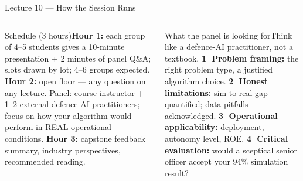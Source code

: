 \documentclass[aspectratio=169,10pt,t]{beamer}
\begin{document}

\begin{frame}{Lecture 10 --- How the Session Runs}
\begin{columns}[T]
\begin{cbox}{Schedule (3 hours)}\scriptsize\textbf{Hour 1:} each group of 4--5 students gives a 10-minute presentation + 2 minutes of panel Q\&A; slots drawn by lot; 4--6 groups expected. \textbf{Hour 2:} open floor --- any question on any lecture. Panel: course instructor + 1--2 external defence-AI practitioners; focus on how your algorithm would perform in REAL operational conditions. \textbf{Hour 3:} capstone feedback summary, industry perspectives, recommended reading.\end{cbox}
\begin{cbox}[AccentCol]{What the panel is looking for}\scriptsize Think like a defence-AI practitioner, not a textbook. \textbf{\textcircled{\tiny1} Problem framing:} the right problem type, a justified algorithm choice. \textbf{\textcircled{\tiny2} Honest limitations:} sim-to-real gap quantified; data pitfalls acknowledged. \textbf{\textcircled{\tiny3} Operational applicability:} deployment, autonomy level, ROE. \textbf{\textcircled{\tiny4} Critical evaluation:} would a sceptical senior officer accept your 94\% simulation result?\end{cbox}
\end{columns}
\end{frame}
\end{document}
